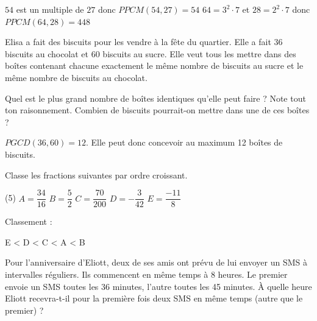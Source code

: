 \documentclass[parskip=half-,twoside=semi, DIV=12, 12pt]{scrartcl}
\begin{document}
\begin{solappliquer}
    \begin{tasks}
        \task \(54\) est un multiple de \(27\) donc \(PPCM(54,27)=54\)
        \task \(64 = 3^2 \cdot 7\) et \(28 = 2^2 \cdot 7\) donc \(PPCM(64, 28) = 448\)
    \end{tasks}
\end{solappliquer}
\begin{transferer}[points=3]
    Elisa a fait des biscuits pour les vendre à la fête du quartier. Elle a
    fait 36 biscuits au chocolat et 60 biscuits au sucre. Elle veut tous les
    mettre dans des boîtes contenant chacune exactement le même nombre
    de biscuits au sucre et le même nombre de biscuits au chocolat.
    \begin{tasks}[after-item-skip=7cm]
        \task Quel est le plus grand nombre de boîtes identiques qu'elle peut faire ? Note tout ton raisonnement.
        \task Combien de biscuits pourrait-on mettre dans une de ces boîtes ? 
    \end{tasks}
\end{transferer}
\begin{soltransferer}
    \(PGCD(36,60) = 12\). Elle peut donc concevoir au maximum 12 boîtes de biscuits.
\end{soltransferer}
\newpage
\begin{appliquer}[points=2]
    Classe les fractions suivantes par ordre croissant.
    \begin{tasks}[label=](5)
        \task \(A=\dfrac{34}{16}\)
        \task \(B=\dfrac{5}{2}\)
        \task \(C=\dfrac{70}{200}\)
        \task \(D=- \dfrac{3}{42}\)
        \task \(E=\dfrac{- 11}{8}\)
    \end{tasks}
    \vspace{1cm}
    Classement :
    \vspace{1cm}
\end{appliquer}
\begin{solappliquer}
    E < D < C < A < B
\end{solappliquer}
\begin{transferer}[points=2]
    Pour l'anniversaire d'Eliott, deux de ses amis ont prévu de lui envoyer un SMS à intervalles réguliers. Ils commencent en même temps à 8 heures. Le premier envoie un SMS toutes les 36 minutes, l'autre toutes les 45 minutes. À quelle heure Eliott recevra-t-il pour la première fois deux SMS en même temps (autre que le premier) ?
    \vspace{7cm}
\end{transferer}
\end{document}
